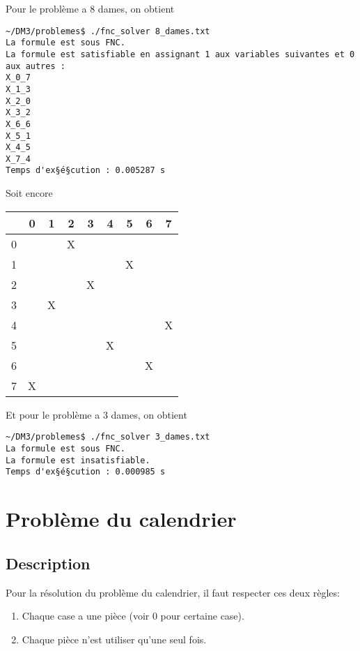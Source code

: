     Pour le problème a 8 dames, on obtient
    \begin{lstlisting}
~/DM3/problemes$ ./fnc_solver 8_dames.txt 
La formule est sous FNC.
La formule est satisfiable en assignant 1 aux variables suivantes et 0 aux autres :
X_0_7
X_1_3
X_2_0
X_3_2
X_6_6
X_5_1
X_4_5
X_7_4
Temps d'ex§é§cution : 0.005287 s
    \end{lstlisting}
    Soit encore
    \begin{center}
        \begin{tabular}{| c || *{8}{c |}}
        \hline
          & 0 & 1 & 2 & 3 & 4 & 5 & 6 & 7 \\
        \hline
        \hline
        0 &   &   & X &   &   &   &   &   \\
        \hline
        1 &   &   &   &   &   & X &   &   \\
        \hline
        2 &   &   &   & X &   &   &   &   \\
        \hline
        3 &   & X &   &   &   &   &   &   \\
        \hline
        4 &   &   &   &   &   &   &   & X \\
        \hline
        5 &   &   &   &   & X &   &   &   \\
        \hline
        6 &   &   &   &   &   &   & X &   \\
        \hline
        7 & X &   &   &   &   &   &   &   \\
        \hline
        \end{tabular}
    \end{center}
    
    Et pour le problème a 3 dames, on obtient
    \begin{lstlisting}
~/DM3/problemes$ ./fnc_solver 3_dames.txt 
La formule est sous FNC.
La formule est insatisfiable.
Temps d'ex§é§cution : 0.000985 s
    \end{lstlisting}
    
    \section{Problème du calendrier}
    \subsection*{Description}
    Pour la résolution du problème du calendrier, il faut respecter ces deux règles:
    \begin{enumerate}
        \item Chaque case a une pièce (voir 0 pour certaine case).
        \item Chaque pièce n'est utiliser qu'une seul fois.
    \end{enumerate}
    
